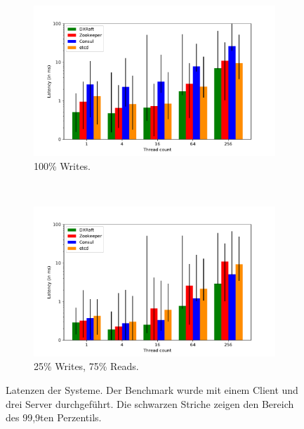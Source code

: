 \begin{figure}[p]
	\centering
	\begin{subfigure}[t]{0.8\textwidth}
		\includegraphics[width=\textwidth]{img/latency.pdf}
		\caption{100\% Writes.}
	\end{subfigure}\\
	\begin{subfigure}[t]{0.8\textwidth}
		\includegraphics[width=\textwidth]{img/latency2.pdf}
		\caption{25\% Writes, 75\% Reads.}
	\end{subfigure}
	\caption{Latenzen der Systeme. Der Benchmark wurde mit einem Client und drei Server durchgeführt. Die schwarzen Striche zeigen den Bereich des 99,9ten Perzentils.}
	\label{fig:latency}
\end{figure}

